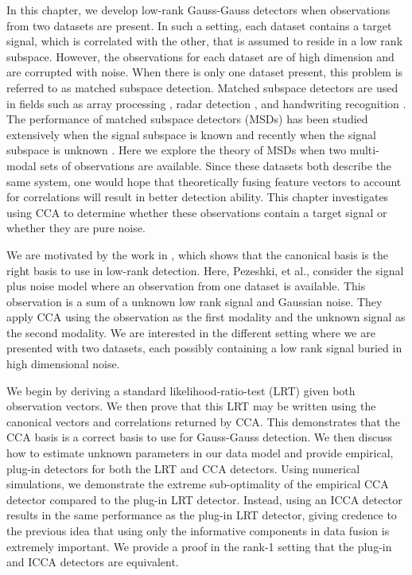In this chapter, we develop low-rank Gauss-Gauss detectors when observations from two
datasets are present. In such a setting, each dataset contains a target signal, which is
correlated with the other, that is assumed to reside in a low rank subspace. However, the
observations for each dataset are of high dimension and are corrupted with noise.  When
there is only one dataset present, this problem is referred to as matched subspace
detection. Matched subspace detectors are used in fields such as array processing
\cite{besson2006cfar, besson2005matched}, radar detection \cite{bandiera2007glrt,
  bandiera2007adaptive}, and handwriting recognition \cite{elden2007matrix}. The performance of matched
subspace detectors (MSDs) has been studied extensively when the signal subspace is known
\cite{mcwhorter2003matched, vincent2008matched, scharf1994matched, jin2005cfar} and
recently when the signal subspace is unknown \cite{asendorf2013performance,
  asendorf2012performance}. Here we explore the theory of MSDs when two multi-modal sets
of observations are available. Since these datasets both describe the same system, one
would hope that theoretically fusing feature vectors to account for correlations will
result in better detection ability. This chapter investigates using CCA to determine
whether these observations contain a target signal or whether they are pure noise.

We are motivated by the work in \cite{pezeshki2006canonical}, which shows that the
canonical basis is the right basis to use in low-rank detection. Here, Pezeshki, et
al., consider the signal plus noise model where an observation from one dataset is
available. This observation is a sum of a unknown low rank signal and Gaussian noise. They
apply CCA using the observation as the first modality and the unknown signal as the second
modality. We are interested in the different setting where we are presented with two
datasets, each possibly containing a low rank signal buried in high dimensional noise.

We begin by deriving a standard likelihood-ratio-test (LRT) given both observation
vectors. We then prove that this LRT may be written using the canonical vectors and
correlations returned by CCA. This demonstrates that the CCA basis is a correct basis to
use for Gauss-Gauss detection. We then discuss how to estimate unknown parameters in our
data model and provide empirical, plug-in detectors for both the LRT and CCA
detectors. Using numerical simulations, we demonstrate the extreme sub-optimality of the
empirical CCA detector compared to the plug-in LRT detector. Instead, using an ICCA
detector results in the same performance as the plug-in LRT detector, giving credence to
the previous idea that using only the informative components in data fusion is extremely
important. We provide a proof in the rank-1 setting that the plug-in and ICCA detectors
are equivalent.


